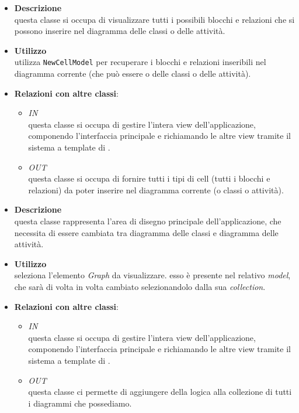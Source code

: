 \label{\nogloxy{swedesigner::client::view::NewCellView}}
\begin{itemize}
\item \textbf{Descrizione}\\
questa classe si occupa di visualizzare tutti i possibili blocchi e relazioni che si possono inserire nel diagramma delle classi o delle attività.
\item \textbf{Utilizzo}\\
utilizza \texttt{NewCellModel} per recuperare i blocchi e relazioni inseribili nel diagramma corrente (che può essere o delle classi o delle attività).
\item \textbf{Relazioni con altre classi}:
\begin{itemize}
\item \textit{IN} \hyperref[\nogloxy{swedesigner::client::view::AppView}]{}\\
questa classe si occupa di gestire l'intera view dell'applicazione, componendo l'interfaccia principale e richiamando le altre view tramite il sistema a template di \backbonejs{}.
\item \textit{OUT} \hyperref[\nogloxy{swedesigner::client::model::NewCellModel}]{}\\
questa classe si occupa di fornire tutti i tipi di cell (tutti i blocchi e relazioni) da poter inserire nel diagramma corrente (o classi o attività).
\end{itemize}
\end{itemize}

\label{\nogloxy{swedesigner::client::view::ProjectView}}
\begin{itemize}
\item \textbf{Descrizione}\\
questa classe rappresenta l'area di disegno principale dell'applicazione, che necessita di essere cambiata tra diagramma delle classi e diagramma delle attività. 
\item \textbf{Utilizzo}\\
seleziona l'elemento \emph{Graph} da visualizzare. esso è presente nel relativo \emph{model}, che sarà di volta in volta cambiato selezionandolo dalla sua \emph{collection}.
\item \textbf{Relazioni con altre classi}:
\begin{itemize}
\item \textit{IN} \hyperref[\nogloxy{swedesigner::client::view::AppView}]{}\\
questa classe si occupa di gestire l'intera view dell'applicazione, componendo l'interfaccia principale e richiamando le altre view tramite il sistema a template di \backbonejs{}.
\item \textit{OUT} \hyperref[\nogloxy{swedesigner::client::model::ProjectModel}]{}\\
questa classe ci permette di aggiungere della logica alla collezione di tutti i diagrammi che possediamo.
\end{itemize}
\end{itemize}

